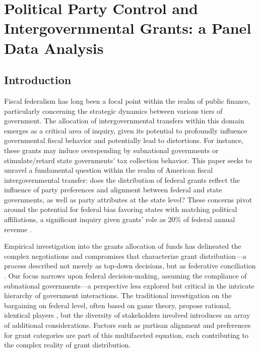 \chapter{Political Party Control and Intergovernmental Grants: a Panel Data Analysis}

\section{Introduction}

Fiscal federalism has long been a focal point within the realm of public finance, particularly concerning the strategic dynamics between various tiers of government\parencite{gordon1983optimal,dahlby1996fiscal,agrawal2022local}.
The allocation of intergovernmental transfers within this domain emerges as a critical area of inquiry, given its potential to profoundly influence governmental fiscal behavior and potentially lead to distortions\parencite{dahlby1996fiscal,gordon1983optimal}. For instance, these grants may induce overspending by subnational governments or stimulate/retard state governments' tax collection behavior\parencite{inman2008flypaper,bailey1998flypaper,turnbull1998overspending}. This paper seeks to unravel a fundamental question within the realm of American fiscal intergovernmental transfer: does the distribution of federal grants reflect the influence of party preferences and alignment between federal and state governments, as well as party attributes at the state level? These concerns pivot around the potential for federal bias favoring states with matching political affiliations, a significant inquiry given grants' role as 20\% of federal annual revenue \parencite{rosenstiel2021congressional}.


Empirical investigation into the grants allocation of funds has delineated the complex negotiations and compromises that characterize grant distribution---a process described not merely as top-down decisions, but as federative conciliation \parencite{chubb1985political, 1976A, dixit1995redistributive}. Our focus narrows upon federal decision-making, assuming the compliance of subnational governments---a perspective less explored but critical in the intricate hierarchy of government interactions. The traditional investigation on the bargaining on federal level, often based on game theory, propose rational, identical players \parencite{baron1989bargaining, banks2006general, martin2018dividing}, but the diversity of stakeholders involved introduces an array of additional considerations\parencite{milligan2005regional, golden2008pork,tellier2006public, petry1999electoral}.
Factors such as partisan alignment and preferences for grant categories are part of this multifaceted equation\parencite{rosenstiel2021congressional}, each contributing to the complex reality of grant distribution.

